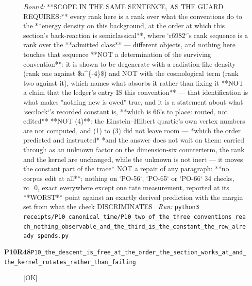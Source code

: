 \begin{description}
 \emph{Bound:}  **SCOPE IN THE SAME SENTENCE, AS THE GUARD REQUIRES:** every rank here is a rank over what the conventions do to the **energy density on this background, at the order at which this section's back-reaction is semiclassical**, where `r6982`'s rank sequence is a rank over the **admitted class** --- different objects, and nothing here touches that sequence  **NOT a determination of the surviving convention**: it is shown to be degenerate with a radiation-like density (rank one against \$a\textasciicircum{}\{-4\}\$) and NOT with the cosmological term (rank two against it), which names what absorbs it rather than fixing it  **NOT a claim that the ledger's entry IS this convention** --- that identification is what makes "nothing new is owed" true, and it is a statement about what `sec:lock`'s recorded constant is, **which is 66's to place: routed, not edited**  **NOT (4)**: the Einstein--Hilbert quartic's own vertex numbers are not computed, and (1) to (3) did not leave room --- *which the order predicted and instructed*  *and the answer does not wait on them: carried through as an unknown factor on the dimension-six counterterm, the rank and the kernel are unchanged, while the unknown is not inert --- it moves the constant part of the trace*  NOT a repair of any paragraph: **no corpus edit at all**; nothing on `PO-56`, `PO-65` or `PO-66`  34 checks, rc=0, exact everywhere except one rate measurement, reported at its **WORST** point against an exactly derived prediction with the margin set from what the check DISCRIMINATES
\ \emph{Run:} \texttt{python3 receipts/P10\_canonical\_time/P10\_two\_of\_the\_three\_conventions\_reach\_nothing\_observable\_and\_the\_third\_is\_the\_constant\_the\_row\_already\_spends.py}
\item[\rcptlabel{P10_the_descent_is_free_at_the_order_the_section_works_at_and_the_kernel_rotates_rather_than_failing}{P10R48}\textbf{P10R48}\quad\texttt{P10\_the\_descent\_is\_free\_at\_the\_order\_the\_section\_works\_at\_and\_the\_kernel\_rotates\_rather\_than\_failing}]\hfill\textsf{[OK]}\\

\end{description}
